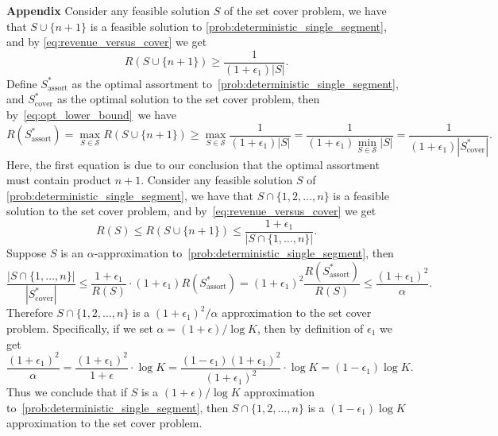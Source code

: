 \documentclass[msom,non-blindrev]{informs3} %
\theoremstyle{definition}
\begin{document}
\begin{appendices}{\Large \noindent\textbf{Appendix}}
    Consider any feasible solution $S$ of the set cover problem, we have that $S\cup\{n+1\}$ is a feasible solution to \eqref{prob:deterministic_single_segment}, and by \eqref{eq:revenue_versus_cover} we get
    \begin{equation}
    R(S\cup\{n+1\})\geq \dfrac{1}{(1+\epsilon_1)|S|}.\label{eq:opt_lower_bound}
    \end{equation}
    Define $S^*_{\text{assort}}$ as the optimal assortment to~\eqref{prob:deterministic_single_segment}, and $S^*_{\text{cover}}$ as the optimal solution to the set cover problem, then by~\eqref{eq:opt_lower_bound}~we have
    \begin{equation*}
    R(S^*_{\text{assort}})=\max_{S\in\mathcal{S}}R(S\cup\{n+1\})\geq\max_{S\in\mathcal{S}}\dfrac{1}{(1+\epsilon_1)|S|}=\dfrac{1}{(1+\epsilon_1)\min_{S\in\mathcal{S}}|S|}=\dfrac{1}{(1+\epsilon_1)|S^*_{\text{cover}}|}.
    \end{equation*}
    Here, the first equation is due to our conclusion that the optimal assortment must contain product $n+1$. Consider any feasible solution $S$ of \eqref{prob:deterministic_single_segment}, we have that $S\cap\{1,2,\dots,n\}$ is a feasible solution to the set cover problem, and by~\eqref{eq:revenue_versus_cover} we get
    \begin{equation*}
    R(S)\leq R(S\cup\{n+1\})\leq \dfrac{1+\epsilon_1}{|S\cap\{1,\dots,n\}|}.
    \end{equation*}
    Suppose $S$ is an $\alpha$-approximation to~\eqref{prob:deterministic_single_segment}, then
    \begin{equation*}
    \dfrac{|S\cap\{1,\dots,n\}|}{|S^*_{\text{cover}}|}\leq \dfrac{1+\epsilon_1}{R(S)}\cdot (1+\epsilon_1)R(S^*_{\text{assort}})=(1+\epsilon_1)^2\dfrac{R(S_{\text{assort}}^*)}{R(S)}\leq \dfrac{(1+\epsilon_1)^2}{\alpha}.
    \end{equation*}
    Therefore $S\cap\{1,2,\dots,n\}$ is a $(1+\epsilon_1)^2/\alpha$ approximation to the set cover problem. Specifically, if we set $\alpha=(1+\epsilon)/\log K$, then by definition of $\epsilon_1$ we get
    \begin{equation*}
    \dfrac{(1+\epsilon_1)^2}{\alpha}=\dfrac{(1+\epsilon_1)^2}{1+\epsilon}\cdot\log K=\dfrac{(1-\epsilon_1)(1+\epsilon_1)^2}{(1+\epsilon_1)^2}\cdot\log K=(1-\epsilon_1)\log K.
    \end{equation*}
    Thus we conclude that if $S$ is a $(1+\epsilon)/\log K$ approximation to~\eqref{prob:deterministic_single_segment}, then $S\cap\{1,2,\dots,n\}$ is a $(1-\epsilon_1)\log K$ approximation to the set cover problem.
		

\end{appendices}
\end{document}
